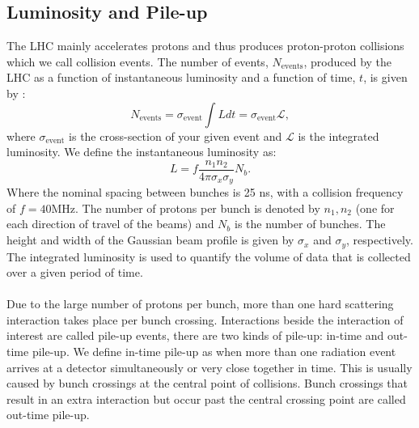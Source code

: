 \subsection{Luminosity and Pile-up}
The LHC mainly accelerates protons and thus produces proton-proton collisions which we call collision events. The number of events, $N_{\text{events}}$, produced by the LHC as a function of instantaneous luminosity and a function of time, $t$, is given by \cite{luminosity}:
\begin{equation}
    N_{\text{events}} = \sigma_{\text{event}}\int L dt = \sigma_{\text{event}} \mathcal{L},
\end{equation}
where $\sigma_{\text{event}}$ is the cross-section of your given event and $\mathcal{L}$ is the integrated luminosity. We define the instantaneous luminosity as: 
\begin{equation}
    L=f\frac{n_1 n_2 }{4\pi \sigma_x \sigma_y}N_b.
\end{equation}
Where the nominal spacing between bunches is 25 ns, with a collision frequency of $f=40$MHz. The number of protons per bunch is denoted by $n_1,n_2$ (one for each direction of travel of the beams) and $N_b$ is the number of bunches. The height and width of the Gaussian beam profile is given by $\sigma_x$ and $\sigma_y$, respectively. The integrated luminosity is used to quantify the volume of data that is collected over a given period of time.
\\
\\
Due to the large number of protons per bunch, more than one hard scattering interaction takes place per bunch crossing. Interactions beside the interaction of interest are called pile-up events, there are two kinds of pile-up: in-time and out-time pile-up. We define in-time pile-up as when more than one radiation event arrives at a detector simultaneously or very close together in time. This is usually caused by bunch crossings at the central point of collisions. Bunch crossings that result in an extra interaction but occur past the central crossing point are called out-time pile-up. 

